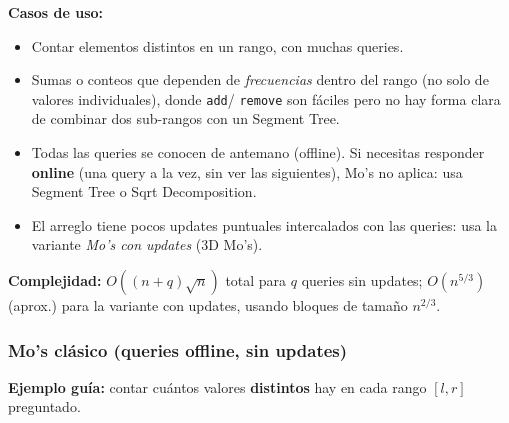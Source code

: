 \documentclass[10pt,a4paper,twocolumn]{article}
\begin{document}
\textbf{Casos de uso:}

\begin{itemize}
    \item Contar elementos distintos en un rango, con muchas queries.
    \item Sumas o conteos que dependen de \emph{frecuencias} dentro
    del rango (no solo de valores individuales), donde \texttt{add}/
    \texttt{remove} son fáciles pero no hay forma clara de combinar
    dos sub-rangos con un Segment Tree.
    \item Todas las queries se conocen de antemano (offline). Si
    necesitas responder \textbf{online} (una query a la vez, sin ver
    las siguientes), Mo's no aplica: usa Segment Tree o Sqrt
    Decomposition.
    \item El arreglo tiene pocos updates puntuales intercalados con
    las queries: usa la variante \emph{Mo's con updates} (3D Mo's).
\end{itemize}

\textbf{Complejidad:} $O((n+q)\sqrt n)$ total para $q$ queries sin
updates; $O(n^{5/3})$ (aprox.) para la variante con updates, usando
bloques de tamaño $n^{2/3}$.


\subsubsection{Mo's clásico (queries offline, sin updates)}

\textbf{Ejemplo guía:} contar cuántos valores \textbf{distintos} hay
en cada rango $[l,r]$ preguntado.
\end{document}
